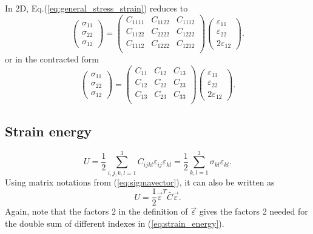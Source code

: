 In 2D, Eq.(\ref{eq:general_stress_strain}) reduces to
%
\begin{equation}\label{eq:general_stress_strain2D}
  \left(\begin{array}{c}
    \sigma_{11} \\
    \sigma_{22} \\
    \sigma_{12}
  \end{array}\right)
  =
  \left(
    \begin{array}{cccccc}
      C_{1111} & C_{1122} & C_{1112} \\
      C_{1122} & C_{2222} & C_{1222} \\
      C_{1112} & C_{1222} & C_{1212} \\
    \end{array}
  \right)
  \left(\begin{array}{c}
    \varepsilon_{11} \\
    \varepsilon_{22} \\
    2\varepsilon_{12}
  \end{array}\right).
\end{equation}
%
or in the contracted form
%
\begin{equation}\label{eq:general_stress_strain2D_b}
  \left(\begin{array}{c}
    \sigma_{11} \\
    \sigma_{22} \\
    \sigma_{12}
  \end{array}\right)
  =
  \left(
    \begin{array}{cccccc}
      C_{11} & C_{12} & C_{13} \\
      C_{12} & C_{22} & C_{23} \\
      C_{13} & C_{23} & C_{33} \\
    \end{array}
  \right)
  \left(\begin{array}{c}
    \varepsilon_{11} \\
    \varepsilon_{22} \\
    2\varepsilon_{12}
  \end{array}\right).
\end{equation}


\subsection{Strain energy}

\begin{equation}\label{eq:strain_energy}
  U=\frac{1}{2}\sum_{i,j,k,l=1}^3 C_{ijkl}\varepsilon_{ij}\varepsilon_{kl}
  =\frac{1}{2}\sum_{k,l=1}^3 \sigma_{kl}\varepsilon_{kl}.
\end{equation}
%
Using matrix notations from (\ref{eq:sigmavector}), it can also be
written as
%
\begin{equation}
  U=\frac{1}{2}\vec\varepsilon^T \bar C\vec\varepsilon.
\end{equation}
%
Again, note that the factors 2 in the definition of $\vec\varepsilon$
gives the factors 2 needed for the double sum of different indexes in
(\ref{eq:strain_energy}).


